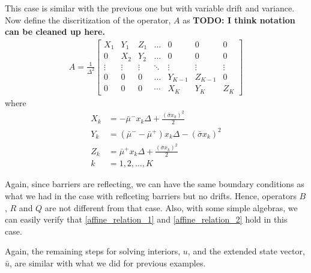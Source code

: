\documentclass[11pt]{article}
\begin{document}
This case is similar with the previous one but with variable drift and variance. Now define the discritization of the operator, $A$ as \textbf{TODO: I think notation can be cleaned up here.}
\begin{align}
A = \frac{1}{\Delta^{2}}
\begin{bmatrix}
X_1&Y_1&Z_1&\dots&0&0&0\\
0&X_2&Y_2&\dots&0&0&0\\
\vdots&\vdots&\vdots&\ddots&\vdots&\vdots&\vdots\\
0&0&0&\dots&Y_{K-1}&Z_{K-1}&0\\
0&0&0&\cdots&X_{K}&Y_{K}&Z_{K}
\end{bmatrix}
\end{align}
where
\begin{align*}
X_k &= -\bar{\mu}^-x_k\Delta+\frac{(\bar{\sigma}x_k)^2}{2}\\
Y_k &= (\bar{\mu}^--\bar{\mu}^+)x_k\Delta-(\bar{\sigma}x_k)^2\\
Z_k &=\bar{\mu}^+x_k\Delta+\frac{(\bar{\sigma}x_k)^2}{2}\\
k & = 1, 2,\dots, K
\end{align*}

Again, since barriers are reflecting, we can have the same boundary conditions as what we had in the case with reflceting barriers but no drifts. Hence, operators $B$, $R$ and $Q$ are not different from that case. Also, with some simple algebras, we can easily verify that \eqref{affine_relation_1} and \eqref{affine_relation_2} hold in this case.

\iffalse
In this example, the matrix $P$ in \eqref{solve_u_hat_cond_1} becomes
\begin{align}
P = \frac{1}{\Delta^{2}} \begin{bmatrix}
-X_1&r\Delta^2-Y_1&-Z_1&\dots&0&0&0\\
0&-X_2&r\Delta^2-Y_2&\dots&0&0&0\\
\vdots&\vdots&\vdots&\ddots&\vdots&\vdots&\vdots\\
0&0&0&\dots&r\Delta^2-Y_{K-1}&-Z_{K-1}&0\\
0&0&0&\cdots&-X_K&r\Delta^2-Y_K&-Z_K
\end{bmatrix}
\end{align}
\fi
Again, the remaining steps for solving interiors, $u$, and the extended state vector, $\bar{u}$, are similar with what we did for previous examples.
\end{document}
